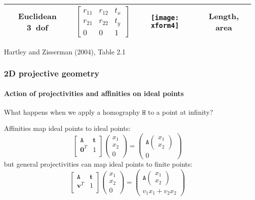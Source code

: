 \documentclass[aspectratio=169]{beamer}
\renewcommand{\vec}[1]{\boldsymbol{#1}}
\newcommand{\mat}[1]{\mathtt{#1}}
\begin{document}
\begin{frame}
{\begin{tabular}{cccc}
\hline
\begin{minipage}{0.5in} Euclidean 3~dof \end{minipage} &
$\begin{bmatrix}r_{11} & r_{12} & t_x \\
                r_{21} & r_{22} & t_y \\
                0 & 0 & 1 \end{bmatrix}$ &
\parbox{0.5in}{\centerline{\texttt{[image: xform4]}}} &
\begin{minipage}{1.8in} Length, area\end{minipage} \\
\hline
\hline
\end{tabular}}

\centerline{\scriptsize Hartley and Zisserman (2004), Table 2.1}

\end{frame}

\begin{frame}
\frametitle{2D projective geometry}
\framesubtitle{Action of projectivities and affinities on ideal points}

What happens when we apply a homography $\mat{H}$ to a point at
infinity?

\medskip

Affinities map ideal points to ideal points:
\begin{equation*}
\begin{bmatrix}
\mat{A} & \vec{t} \\
\vec{0}^T & 1 \\
\end{bmatrix}
\begin{pmatrix}
x_1 \\ x_2 \\ 0
\end{pmatrix}
=
\begin{pmatrix}
\mat{A} \begin{pmatrix} x_1 \\ x_2 \end{pmatrix}\\
0
\end{pmatrix}
\end{equation*}
but general projectivities can map ideal points to finite points:
\begin{equation*}
\begin{bmatrix}
\mat{A} & \vec{t} \\
\vec{v}^T & 1 \\
\end{bmatrix}
\begin{pmatrix}
x_1 \\ x_2 \\ 0
\end{pmatrix}
=
\begin{pmatrix}
\mat{A} \begin{pmatrix} x_1 \\ x_2 \end{pmatrix}\\
v_1 x_1 + v_2 x_2
\end{pmatrix}
\end{equation*}

\end{frame}
\end{document}
